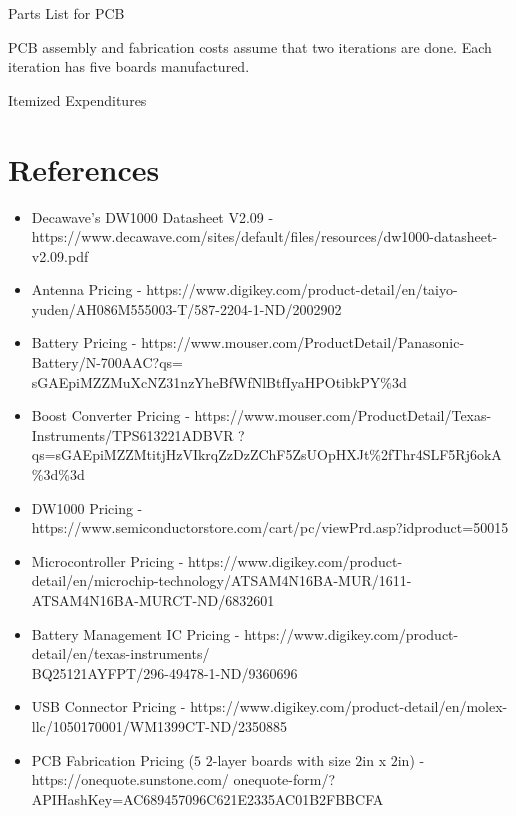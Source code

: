 \documentclass{article}
\begin{document}
\FloatBarrier

 \begin{table}[h!]
 	\centering
 	\caption{Parts List for PCB}
 	\label{tab:partslist}
\end{table}

\FloatBarrier

PCB assembly and fabrication costs assume that two iterations are done.
Each iteration has five boards manufactured.

\FloatBarrier

\begin{table}[h!]
  	\centering
  	\caption{Itemized Expenditures}
  	\label{tab:costs}
\end{table}

\FloatBarrier

\section{References}
\begin{itemize}
\item Decawave's DW1000 Datasheet V2.09 - https://www.decawave.com/sites/default/files/resources/dw1000-datasheet-v2.09.pdf
\item Antenna Pricing - https://www.digikey.com/product-detail/en/taiyo-yuden/AH086M555003-T/587-2204-1-ND/2002902 
\item Battery Pricing - https://www.mouser.com/ProductDetail/Panasonic-Battery/N-700AAC?qs=
sGAEpiMZZMuXcNZ31nzYheBfWfNlBtfIyaHPOtibkPY\%3d
\item Boost Converter Pricing - https://www.mouser.com/ProductDetail/Texas-Instruments/TPS613221ADBVR ?qs=sGAEpiMZZMtitjHzVIkrqZzDzZChF5ZsUOpHXJt\%2fThr4SLF5Rj6okA\%3d\%3d
\item DW1000 Pricing - https://www.semiconductorstore.com/cart/pc/viewPrd.asp?idproduct=50015
\item Microcontroller Pricing - https://www.digikey.com/product-detail/en/microchip-technology/ATSAM4N16BA-MUR/1611-ATSAM4N16BA-MURCT-ND/6832601
\item Battery Management IC Pricing - https://www.digikey.com/product-detail/en/texas-instruments/\\ BQ25121AYFPT/296-49478-1-ND/9360696
\item USB Connector Pricing - https://www.digikey.com/product-detail/en/molex-llc/1050170001/WM1399CT-ND/2350885
\item PCB Fabrication Pricing ($5$ $2$-layer boards with size $2$in x $2$in) - https://onequote.sunstone.com/
onequote-form/?APIHashKey=AC689457096C621E2335AC01B2FBBCFA
\end{itemize}
\end{document}
